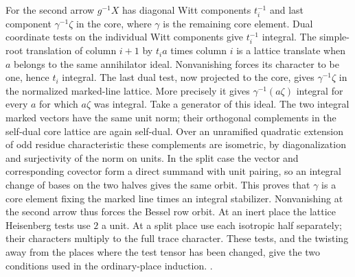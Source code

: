 For the second arrow \(g^{-1}X\) has diagonal Witt
components \(t_i^{-1}\) and last component
\(\gamma^{-1}\zeta\) in the core, where \(\gamma\) is
the remaining core element. Dual coordinate tests on the
individual Witt components give \(t_i^{-1}\) integral.
The simple-root translation of column \(i+1\) by
\(t_i a\) times column \(i\) is a lattice translate
when \(a\) belongs to the same annihilator ideal.
Nonvanishing forces its character to be one, hence \(t_i\)
integral. The last dual test, now projected to the core,
gives \(\gamma^{-1}\zeta\) in the normalized marked-line
lattice. More precisely it gives
\(\gamma^{-1}(a\zeta)\) integral for every \(a\) for which
\(a\zeta\) was integral. Take a generator of this ideal.
The two integral marked vectors have the same unit norm;
their orthogonal complements in the self-dual core lattice
are again self-dual. Over an unramified quadratic extension
of odd residue characteristic these complements are
isometric, by diagonalization and surjectivity of the norm
on units. In the split case the vector and corresponding
covector form a direct summand with unit pairing, so an
integral change of bases on the two halves gives the same
orbit. This proves that \(\gamma\) is a core element fixing
the marked line times an integral stabilizer. Nonvanishing
at the second arrow thus forces the Bessel row orbit.
At an inert place the lattice Heisenberg tests use \(2\)
a unit. At a split place use each isotropic half separately;
their characters multiply to the full trace character.
These tests, and the twisting away from the places where
the test tensor has been changed, give the two conditions
used in the ordinary-place induction.
.

